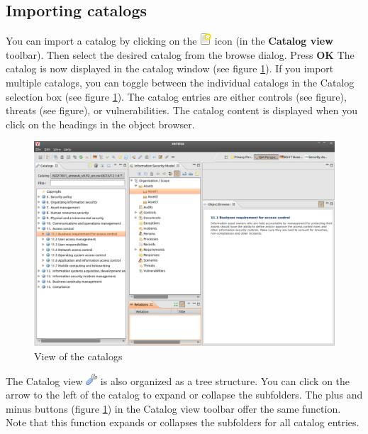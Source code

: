 \documentclass[a4paper,10pt]{book}
\begin{document}
\subsection{Importing catalogs}
You can import a catalog by clicking on the \includegraphics[height=2ex]{Icon/Oeffnen.png} icon (in the \textbf{Catalog view} toolbar).
Then select the desired catalog from the browse dialog. Press \textbf{OK} The catalog is now displayed
in the catalog window (see figure \ref{View of the catalogs}). If you import multiple catalogs, you can toggle between the individual
catalogs in the Catalog selection box (see figure \ref{View of the catalogs}). The catalog entries are either controls (see figure),
threats (see figure), or vulnerabilities. The catalog content is displayed when you click on the headings
in the object browser.
\begin{figure}[htb!]
  \centering
  \includegraphics[scale=.25]{Screenshot/Kataloge_screenshot-en.png}
  \caption{\label{View of the catalogs} View of the catalogs}
\end{figure}
\newline
The Catalog view \includegraphics[height=2ex]{Icon/Control_Kataloge.png} is also organized as a tree structure.
You can click on the arrow to the left of the catalog to expand or collapse the subfolders. The plus and
minus buttons (figure \ref{View of the catalogs}) in the Catalog view toolbar offer the same function. Note that this function expands
or collapses the subfolders for all catalog entries.
\end{document}
